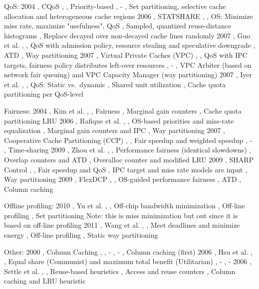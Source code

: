 
		
QoS:
2004 , CQoS , \cite{cqos} , Priority-based , - , Set partitioning, selective cache allocation and heterogeneous cache regions  
2006 , STATSHARE , \cite{petoumenos06} , OS: Minimize miss rate, maximize "usefulness", QoS  , Sampled, quantized reuse-distance histograms  , Replace decayed over non-decayed cache lines randomly 	
2007 , Guo et al. , \cite{qosInCMPs} , QoS with admission policy, resource stealing and speculative downgrade  , ATD , Way partitioning  
2007 , Virtual Private Caches (VPC) , \cite{virtualPrivateCaches} , QoS with IPC targets, fairness policy distributes left-over resources , - , VPC Arbiter (based on network fair queuing) and VPC Capacity Manager (way partitioning) 
2007 , Iyer et al. , \cite{qosPoliciesForCMP} , QoS: Static vs.\ dynamic , Shared unit utilization , Cache quota partitioning per QoS-level  

Fairness:
2004 , Kim et al. , \cite{fairCacheSharingAndPartitioning} , Fairness , Marginal gain counters , Cache quota partitioning LRU  
2006 , Rafique et al. , \cite{osSupportForFairCacheSharing} , OS-based priorities and miss-rate equalization \cite{fairCacheSharingAndPartitioning} , Marginal gain counters and IPC , Way partitioning  	
2007 , Cooperative Cache Partitioning (CCP) , \cite{cooperativeCachePartitioning} , Fair speedup and weighted speedup , - , Time-sharing  	
2009 , Zhou et al. , \cite{zhou09} , Performance fairness (identical slowdowns) , Overlap counters and ATD , Overalloc counter and modified LRU  	
2009 , SHARP Control , \cite{sharpControl} , Fair speedup and QoS , IPC target and miss rate models are input , Way partitioning  	
2009 , FlexDCP , \cite{flexDCP} , OS-guided performance fairness , ATD , Column caching  
		
Offline profiling:
2010 , Yu et al. , \cite{yu10} , Off-chip bandwidth minimization , Off-line profiling , Set partitioning \cite{ranganathan00} Note: this is miss minimization but out since it is based on off-line profiling  	
2011 , Wang et al. , \cite{wang11} , Meet deadlines and minimize energy , Off-line profiling , Static way partitioning  	

Other:
2000 , Column Caching , \cite{columnCaching} , - , - , Column caching (first)  
2006 , Hsu et al. , \cite{sharedCachePolicies} , Equal share (Communist) and maximum total benefit (Utilitarian) , - , -  
2006 , Settle et al. , \cite{dynReconfCache} , Reuse-based heuristics , Access and reuse counters , Column caching and LRU heuristic  
